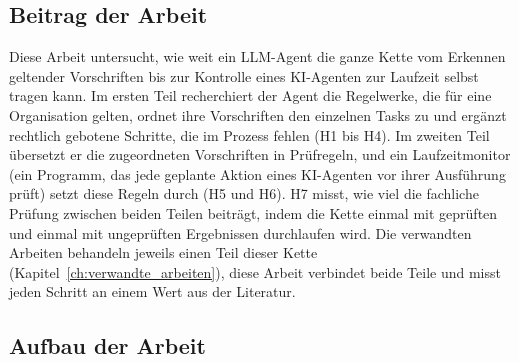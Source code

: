 \subsection{Beitrag der Arbeit}
Diese Arbeit untersucht, wie weit ein LLM-Agent die ganze Kette vom Erkennen geltender Vorschriften bis zur Kontrolle eines KI-Agenten zur Laufzeit selbst tragen kann.
Im ersten Teil recherchiert der Agent die Regelwerke, die für eine Organisation gelten, ordnet ihre Vorschriften den einzelnen Tasks zu und ergänzt rechtlich gebotene Schritte, die im Prozess fehlen (H1 bis H4).
Im zweiten Teil übersetzt er die zugeordneten Vorschriften in Prüfregeln, und ein Laufzeitmonitor (ein Programm, das jede geplante Aktion eines KI-Agenten vor ihrer Ausführung prüft) setzt diese Regeln durch (H5 und H6).
H7 misst, wie viel die fachliche Prüfung zwischen beiden Teilen beiträgt, indem die Kette einmal mit geprüften und einmal mit ungeprüften Ergebnissen durchlaufen wird.
Die verwandten Arbeiten behandeln jeweils einen Teil dieser Kette (Kapitel~\ref{ch:verwandte_arbeiten}), diese Arbeit verbindet beide Teile und misst jeden Schritt an einem Wert aus der Literatur.

\subsection{Aufbau der Arbeit}
